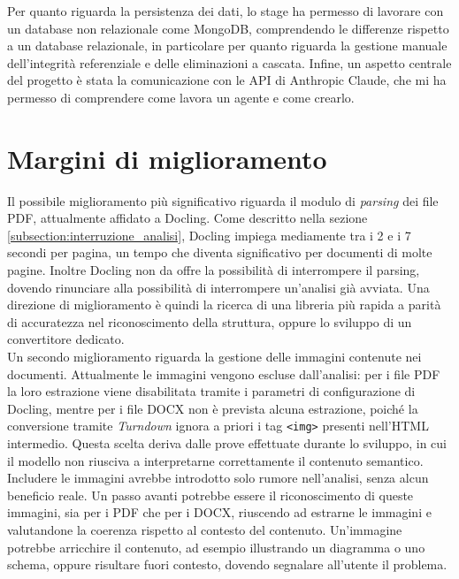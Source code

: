 Per quanto riguarda la persistenza dei dati, lo stage ha permesso di lavorare con un database non relazionale come MongoDB, comprendendo le differenze rispetto a un database relazionale, in particolare per quanto riguarda la gestione manuale dell'integrità referenziale e delle eliminazioni a cascata. Infine, un aspetto centrale del progetto è stata la comunicazione con le API di Anthropic Claude, che mi ha permesso di comprendere come lavora un agente e come crearlo.

\section{Margini di miglioramento}
Il possibile miglioramento più significativo riguarda il modulo di \emph{parsing} dei file PDF, attualmente affidato a Docling. Come descritto nella sezione \ref{subsection:interruzione_analisi}, Docling impiega mediamente tra i 2 e i 7 secondi per pagina, un tempo che diventa significativo per documenti di molte pagine. Inoltre Docling non da offre la possibilità di interrompere il parsing, dovendo rinunciare alla possibilità di interrompere un'analisi già avviata. Una direzione di miglioramento è quindi la ricerca di una libreria più rapida a parità di accuratezza nel riconoscimento della struttura, oppure lo sviluppo di un convertitore dedicato.\\

Un secondo miglioramento riguarda la gestione delle immagini contenute nei documenti. Attualmente le immagini vengono escluse dall'analisi: per i file PDF la loro estrazione viene disabilitata tramite i parametri di configurazione di Docling, mentre per i file DOCX non è prevista alcuna estrazione, poiché la conversione tramite \emph{Turndown} ignora a priori i tag \texttt{<img>} presenti nell'HTML intermedio. Questa scelta deriva dalle prove effettuate durante lo sviluppo, in cui il modello non riusciva a interpretarne correttamente il contenuto semantico. Includere le immagini avrebbe introdotto solo rumore nell'analisi, senza alcun beneficio reale. Un passo avanti potrebbe essere il riconoscimento di queste immagini, sia per i PDF che per i DOCX, riuscendo ad estrarne le immagini e valutandone la coerenza rispetto al contesto del contenuto. Un'immagine potrebbe arricchire il contenuto, ad esempio illustrando un diagramma o uno schema, oppure risultare fuori contesto, dovendo segnalare all'utente il problema.\\

